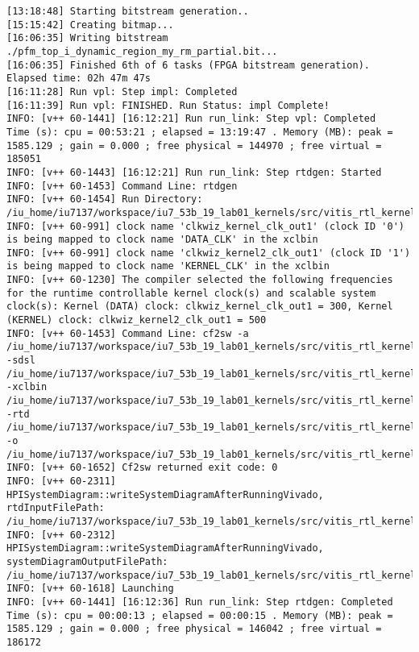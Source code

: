 \begin{center}
\begin{lstlisting}[label=lst:vlog,caption=Файл v++\_vinc.log]
[13:18:48] Starting bitstream generation..
[15:15:42] Creating bitmap...
[16:06:35] Writing bitstream ./pfm_top_i_dynamic_region_my_rm_partial.bit...
[16:06:35] Finished 6th of 6 tasks (FPGA bitstream generation). Elapsed time: 02h 47m 47s 
[16:11:28] Run vpl: Step impl: Completed
[16:11:39] Run vpl: FINISHED. Run Status: impl Complete!
INFO: [v++ 60-1441] [16:12:21] Run run_link: Step vpl: Completed
Time (s): cpu = 00:53:21 ; elapsed = 13:19:47 . Memory (MB): peak = 1585.129 ; gain = 0.000 ; free physical = 144970 ; free virtual = 185051
INFO: [v++ 60-1443] [16:12:21] Run run_link: Step rtdgen: Started
INFO: [v++ 60-1453] Command Line: rtdgen
INFO: [v++ 60-1454] Run Directory: /iu_home/iu7137/workspace/iu7_53b_19_lab01_kernels/src/vitis_rtl_kernel/rtl_kernel_wizard_1/_x/link/run_link
INFO: [v++ 60-991] clock name 'clkwiz_kernel_clk_out1' (clock ID '0') is being mapped to clock name 'DATA_CLK' in the xclbin
INFO: [v++ 60-991] clock name 'clkwiz_kernel2_clk_out1' (clock ID '1') is being mapped to clock name 'KERNEL_CLK' in the xclbin
INFO: [v++ 60-1230] The compiler selected the following frequencies for the runtime controllable kernel clock(s) and scalable system clock(s): Kernel (DATA) clock: clkwiz_kernel_clk_out1 = 300, Kernel (KERNEL) clock: clkwiz_kernel2_clk_out1 = 500
INFO: [v++ 60-1453] Command Line: cf2sw -a /iu_home/iu7137/workspace/iu7_53b_19_lab01_kernels/src/vitis_rtl_kernel/rtl_kernel_wizard_1/_x/link/int/address_map.xml -sdsl /iu_home/iu7137/workspace/iu7_53b_19_lab01_kernels/src/vitis_rtl_kernel/rtl_kernel_wizard_1/_x/link/int/sdsl.dat -xclbin /iu_home/iu7137/workspace/iu7_53b_19_lab01_kernels/src/vitis_rtl_kernel/rtl_kernel_wizard_1/_x/link/int/xclbin_orig.xml -rtd /iu_home/iu7137/workspace/iu7_53b_19_lab01_kernels/src/vitis_rtl_kernel/rtl_kernel_wizard_1/_x/link/int/vinc.rtd -o /iu_home/iu7137/workspace/iu7_53b_19_lab01_kernels/src/vitis_rtl_kernel/rtl_kernel_wizard_1/_x/link/int/vinc.xml
INFO: [v++ 60-1652] Cf2sw returned exit code: 0
INFO: [v++ 60-2311] HPISystemDiagram::writeSystemDiagramAfterRunningVivado, rtdInputFilePath: /iu_home/iu7137/workspace/iu7_53b_19_lab01_kernels/src/vitis_rtl_kernel/rtl_kernel_wizard_1/_x/link/int/vinc.rtd
INFO: [v++ 60-2312] HPISystemDiagram::writeSystemDiagramAfterRunningVivado, systemDiagramOutputFilePath: /iu_home/iu7137/workspace/iu7_53b_19_lab01_kernels/src/vitis_rtl_kernel/rtl_kernel_wizard_1/_x/link/int/systemDiagramModelSlrBaseAddress.json
INFO: [v++ 60-1618] Launching 
INFO: [v++ 60-1441] [16:12:36] Run run_link: Step rtdgen: Completed
Time (s): cpu = 00:00:13 ; elapsed = 00:00:15 . Memory (MB): peak = 1585.129 ; gain = 0.000 ; free physical = 146042 ; free virtual = 186172

\end{lstlisting}
\end{center}
